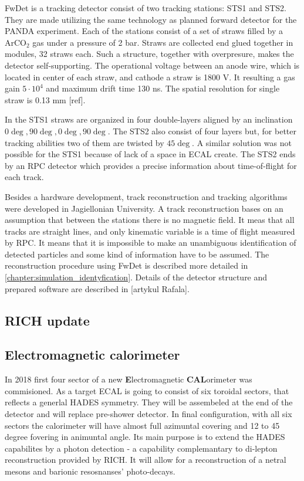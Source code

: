 FwDet is a tracking detector consist of two tracking stations: STS1 and STS2. They are made utilizing the same technology as planned forward detector for the PANDA experiment. Each of the stations consist of a set of straws filled by a ArCO$_2$ gas under a pressure of 2 bar. Straws are collected end glued together in modules, 32 straws each. Such a structure, together with overpresure, makes the detector self-supporting. The operational voltage between an anode wire, which is located in center of each straw, and cathode a straw is 1800 V. It resulting a gas gain $5 \cdot 10^4$ and maximum drift time 130 ns. The spatial resolution for single straw is 0.13 mm [ref].

In the STS1 straws are organized in four double-layers aligned by an inclination $0\deg, 90\deg, 0\deg, 90\deg$. The STS2 also consist of four layers but, for better tracking abilities two of them are twisted by $45\deg$. A similar solution was not possible for the STS1 because of lack of a space in ECAL create. The STS2 ends by an RPC detector which provides a precise information about time-of-flight for each track.

Besides a hardware development, track reconstruction and tracking algorithms were developed in Jagiellonian University. A track reconstruction bases on an assumption that between the stations there is no magnetic field. It meas that all tracks are straight lines, and only kinematic variable is a time of flight measured by RPC. It means that it is impossible to make an unambiguous identification of detected particles and some kind of information have to be assumed. The reconstruction procedure using FwDet is described more detailed in \ref{chapter:simulation_identyfication}. Details of the detector structure and prepared software are described in [artykul Rafala]. 
\subsection{RICH update}

\subsection{Electromagnetic calorimeter}
In 2018 first four sector of a new \textbf{E}lectromagnetic \textbf{CAL}orimeter was commisioned. As a target ECAL is going to consist of six toroidal sectors, that reflects a generlal HADES symmetry. They will be assembeled at the end of the detector and will replace pre-shower detector. In final configuration, with all six sectors the calorimeter will have almost full azimuntal covering and 12 to 45 degree fovering in animuntal angle. Its main purpose is to extend the HADES capabilites by a photon detection - a capability complemantary to di-lepton reconstruction provided by RICH. It will allow for a reconstruction of a netral mesons and barionic resosnanses' photo-decays.

